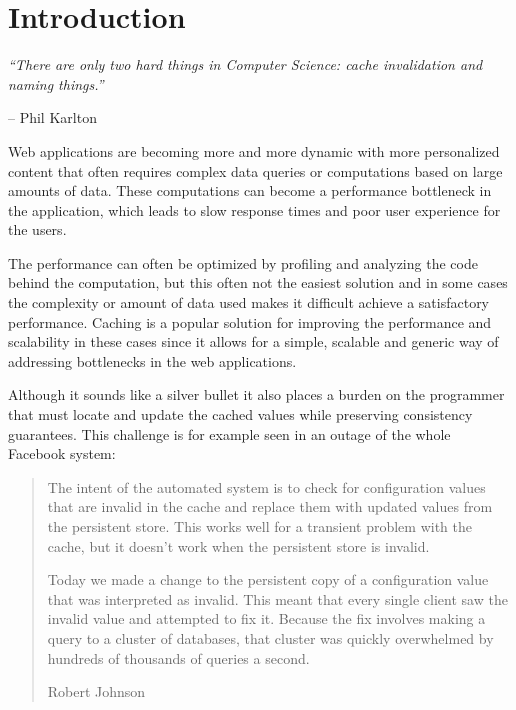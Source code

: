 \chapter{Introduction}

\emph{``There are only two hard things in Computer Science: cache invalidation and naming things.''} \vspace{-1cm}
\begin{flushright}-- Phil Karlton\end{flushright}

Web applications are becoming more and more dynamic with more personalized content that often requires complex data queries or computations based on large amounts of data. These computations can become a performance bottleneck in the application, which leads to slow response times and poor user experience for the users.

The performance can often be optimized by profiling and analyzing the code behind the computation, but this often not the easiest solution and in some cases the complexity or amount of data used makes it difficult achieve a satisfactory performance. Caching is a popular solution for improving the performance and scalability in these cases since it allows for a simple, scalable and generic way of addressing bottlenecks in the web applications.

Although it sounds like a silver bullet it also places a burden on the programmer that must locate and update the cached values while preserving consistency guarantees. This challenge is for example seen in an outage of the whole Facebook system:

\begin{quote}
  The intent of the automated system is to check for configuration values that are invalid in the cache and replace them with updated values from the persistent store. This works well for a transient problem with the cache, but it doesn’t work when the persistent store is invalid.

 Today we made a change to the persistent copy of a configuration value that was interpreted as invalid. This meant that every single client saw the invalid value and attempted to fix it. Because the fix involves making a query to a cluster of databases, that cluster was quickly overwhelmed by hundreds of thousands of queries a second.
\begin{flushright}Robert Johnson~\cite{facebook_outage}\end{flushright}
\end{quote}

